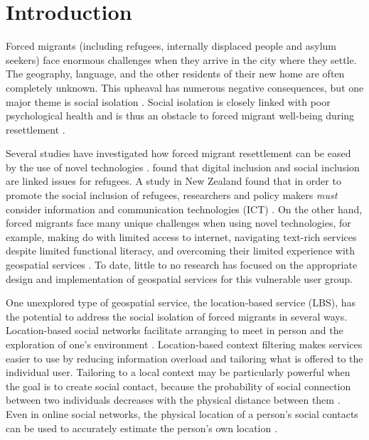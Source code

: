 \chapter{Introduction}
\label{cha:introduction}

Forced migrants (including refugees, internally displaced people and asylum seekers) face enormous challenges when they arrive in the city where they settle. The geography, language, and the other residents of their new home are often completely unknown. This upheaval has numerous negative consequences, but one major theme is social isolation \cite{almohamed_designing_2016}. Social isolation is closely linked with poor psychological health and is thus an obstacle to forced migrant well-being during resettlement \cite{simich_social_2003, schweitzer_trauma_2006}.

Several studies have investigated how forced migrant resettlement can be eased by the use of novel technologies \cite{almohamed_vulnerability_2016, schreieck_supporting_2017, verbert_refugees_2016, brown_designing_2016}.  found that digital inclusion and social inclusion are linked issues for refugees. A study in New Zealand found that in order to promote the social inclusion of refugees, researchers and policy makers \textit{must} consider information and communication technologies (ICT) \cite{diaz_andrade_information_2016}. On the other hand, forced migrants face many unique challenges when using novel technologies, for example, making do with limited access to internet, navigating text-rich services despite limited functional literacy, and overcoming their limited experience with geospatial services \cite{bustamante_duarte_exploring_2018}. To date, little to no research has focused on the appropriate design and implementation of geospatial services for this vulnerable user group.

One unexplored type of geospatial service, the location-based service (LBS), has the potential to address the social isolation of forced migrants in several ways. Location-based social networks facilitate arranging to meet in person and the exploration of one’s environment \cite{lee_location-based_2013}. Location-based context filtering makes services easier to use by reducing information overload and tailoring what is offered to the individual user. Tailoring to a local context may be particularly powerful when the goal is to create social contact, because the probability of social connection between two individuals decreases with the physical distance between them \cite{scellato_socio-spatial_2011}. Even in online social networks, the physical location of a person's social contacts can be used to accurately estimate the person's own location  \cite{backstrom_find_2010}.


